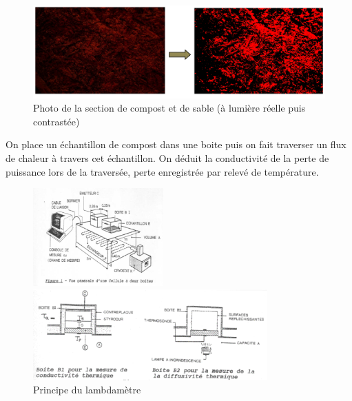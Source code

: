 \documentclass[../PS6_RapportFinal.tex]{subfiles}
\begin{document}
\begin{figure}[h]
\begin{center}
\includegraphics[width=15cm]{2_3_Fraction_volumique.png}
\caption{Photo de la section de compost et de sable (à lumière réelle puis contrastée)}
\label{fraction_volumique}
\end{center}
\end{figure}


On place un échantillon de compost dans une boite puis on fait traverser un flux de chaleur à travers cet échantillon. On déduit la conductivité de la perte de puissance lors de la traversée, perte enregistrée par relevé de température.

\begin{figure}[h]
\centering

\begin{minipage}[h]{5cm}
\centering
\includegraphics[width=5cm]{2_3_lambdametre2.png}
\end{minipage}
\hfill
\begin{minipage}[h]{9cm}
\centering
\includegraphics[width=9cm]{2_3_lambdametre.png}
\end{minipage}
\label{mesure_conductivimetre}

\caption{Principe du lambdamètre}
\end{figure}
\end{document}
